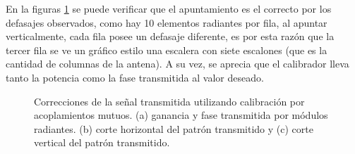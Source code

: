 En la figuras \ref{fig:nonErrMutual10degRow} se puede verificar que el apuntamiento es el correcto por los defasajes observados, 
como hay 10 elementos radiantes por fila, al apuntar verticalmente, cada fila posee un defasaje diferente, es por esta razón que 
la tercer fila se ve un gráfico estilo una escalera con siete escalones (que es la cantidad de columnas de la antena). A su vez, 
se aprecia que el calibrador lleva tanto la potencia como la fase transmitida al valor deseado.
\begin{figure}[H]
	\centering

	\caption{Correcciones de la señal transmitida utilizando calibración por acoplamientos mutuos. (a) ganancia y fase 
		transmitida por módulos radiantes. (b) corte horizontal del patrón transmitido y (c) corte vertical del patrón transmitido.}
	\label{fig:nonErrMutual10degRow}
\end{figure}

